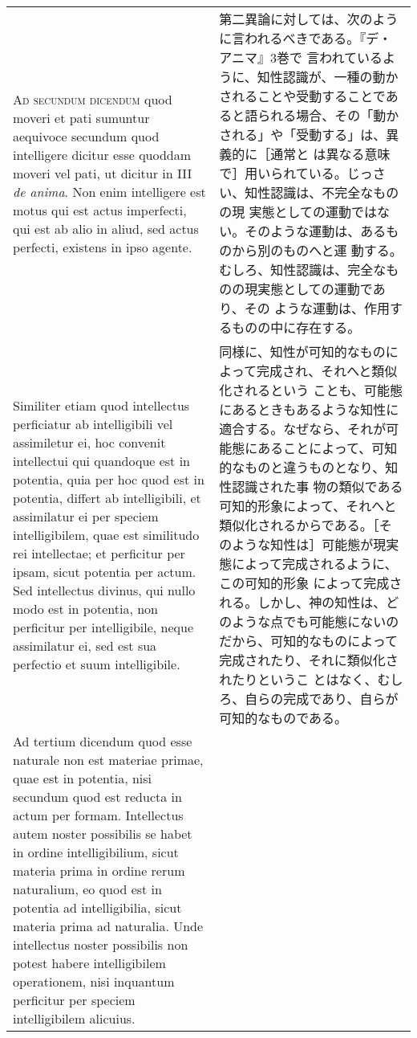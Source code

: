 \documentclass[10pt]{jsarticle} %
\begin{document}
\begin{longtable}{p{21em}p{21em}}
\\


{\scshape Ad secundum dicendum} quod moveri et pati sumuntur aequivoce
secundum quod intelligere dicitur esse quoddam moveri vel pati, ut
dicitur in III {\itshape de anima}. Non enim intelligere est motus qui
est actus imperfecti, qui est ab alio in aliud, sed actus perfecti,
existens in ipso agente.

&

第二異論に対しては、次のように言われるべきである。『デ・アニマ』3巻で
言われているように、知性認識が、一種の動かされることや受動することであ
ると語られる場合、その「動かされる」や「受動する」は、異義的に［通常と
は異なる意味で］用いられている。じっさい、知性認識は、不完全なものの現
実態としての運動ではない。そのような運動は、あるものから別のものへと運
動する。むしろ、知性認識は、完全なものの現実態としての運動であり、その
ような運動は、作用するものの中に存在する。


\\

Similiter etiam quod intellectus perficiatur ab intelligibili vel
assimiletur ei, hoc convenit intellectui qui quandoque est in
potentia, quia per hoc quod est in potentia, differt ab intelligibili,
et assimilatur ei per speciem intelligibilem, quae est similitudo rei
intellectae; et perficitur per ipsam, sicut potentia per actum. Sed
intellectus divinus, qui nullo modo est in potentia, non perficitur
per intelligibile, neque assimilatur ei, sed est sua perfectio et suum
intelligibile.


&


同様に、知性が可知的なものによって完成され、それへと類似化されるという
ことも、可能態にあるときもあるような知性に適合する。なぜなら、それが可
能態にあることによって、可知的なものと違うものとなり、知性認識された事
物の類似である可知的形象によって、それへと類似化されるからである。［そ
のような知性は］可能態が現実態によって完成されるように、この可知的形象
によって完成される。しかし、神の知性は、どのような点でも可能態にないの
だから、可知的なものによって完成されたり、それに類似化されたりというこ
とはなく、むしろ、自らの完成であり、自らが可知的なものである。


\\


Ad tertium dicendum quod esse naturale non est materiae primae, quae
est in potentia, nisi secundum quod est reducta in actum per
formam. Intellectus autem noster possibilis se habet in ordine
intelligibilium, sicut materia prima in ordine rerum naturalium, eo
quod est in potentia ad intelligibilia, sicut materia prima ad
naturalia. Unde intellectus noster possibilis non potest habere
intelligibilem operationem, nisi inquantum perficitur per speciem
intelligibilem alicuius.


\end{longtable}
\end{document}

